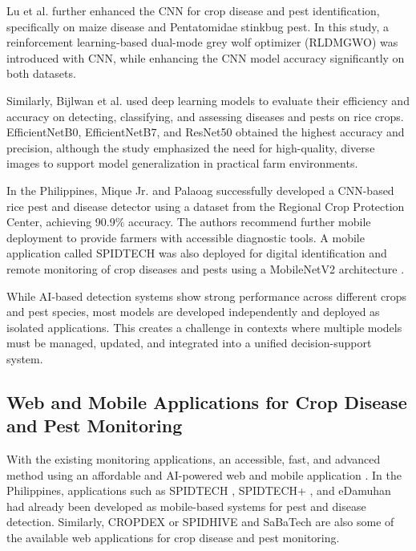 \documentclass{icsthesis}
\begin{document}
\begin{mainmatter}
            Lu et al. \cite{lu-2025} further enhanced the CNN for crop disease and pest identification, specifically on maize disease and Pentatomidae stinkbug pest. In this study, a reinforcement learning-based dual-mode grey wolf optimizer (RLDMGWO) was introduced with CNN, while enhancing the CNN model accuracy significantly on both datasets.

            Similarly, Bijlwan et al. \cite{bijlwan-2025} used deep learning models to evaluate their efficiency and accuracy on detecting, classifying, and assessing diseases and pests on rice crops. EfficientNetB0, EfficientNetB7, and ResNet50 obtained the highest accuracy and precision, although the study emphasized the need for high-quality, diverse images to support model generalization in practical farm environments.

            In the Philippines, Mique Jr. and Palaoag \cite{mique-2018} successfully developed a CNN-based rice pest and disease detector using a dataset from the Regional Crop Protection Center, achieving 90.9\% accuracy. The authors recommend further mobile deployment to provide farmers with accessible diagnostic tools. A mobile application called SPIDTECH was also deployed for digital identification and remote monitoring of crop diseases and pests using a MobileNetV2 architecture \cite{Guiam_Gutierrez_Gapasin_Matalog_Ebuenga_2021}.

            While AI-based detection systems show strong performance across different crops and pest species, most models are developed independently and deployed as isolated applications. This creates a challenge in contexts where multiple models must be managed, updated, and integrated into a unified decision-support system.

            \subsection{Web and Mobile Applications for Crop Disease and Pest Monitoring}
            With the existing monitoring applications, an accessible, fast, and advanced method using an affordable and AI-powered web and mobile application \cite{magnaye-2025, Guiam_Gutierrez_Gapasin_Matalog_Ebuenga_2021}. In the Philippines, applications such as SPIDTECH \cite{Guiam_Gutierrez_Gapasin_Matalog_Ebuenga_2021}, SPIDTECH+ \cite{belleza-2025}, and eDamuhan \cite{tallada-2020} had already been developed as mobile-based systems for pest and disease detection. Similarly, CROPDEX or SPIDHIVE \cite{masicat-2025} and SaBaTech \cite{magnaye-2025} are also some of the available web applications for crop disease and pest monitoring.


\end{mainmatter}
\end{document}
